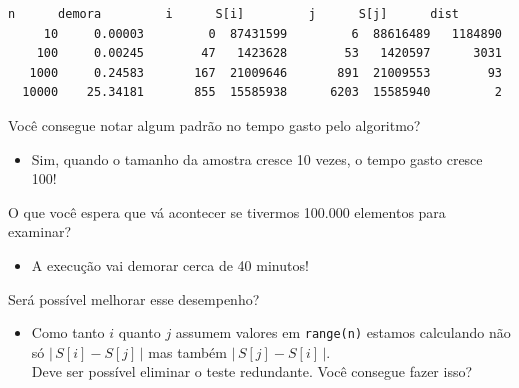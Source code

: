 \documentclass[11pt,a4paper]{article}
\providecommand{\tightlist}{%
      \setlength{\itemsep}{0pt}\setlength{\parskip}{0pt}}
\begin{document}
    \begin{Verbatim}[commandchars=\\\{\}]
      n      demora         i      S[i]         j      S[j]      dist
     10     0.00003         0  87431599         6  88616489   1184890
    100     0.00245        47   1423628        53   1420597      3031
   1000     0.24583       167  21009646       891  21009553        93
  10000    25.34181       855  15585938      6203  15585940         2

    \end{Verbatim}

    Você consegue notar algum padrão no tempo gasto pelo algoritmo?

    \begin{itemize}
\tightlist
\item
  Sim, quando o tamanho da amostra cresce 10 vezes, o tempo gasto cresce
  100!
\end{itemize}

    O que você espera que vá acontecer se tivermos 100.000 elementos para
examinar?

    \begin{itemize}
\tightlist
\item
  A execução vai demorar cerca de 40 minutos!
\end{itemize}

    Será possível melhorar esse desempenho?

\begin{itemize}
\tightlist
\item
  Como tanto \(i\) quanto \(j\) assumem valores em \texttt{range(n)}
  estamos calculando não só \(\lvert\, S[i] - S[j] \,\rvert\) mas também
  \(\lvert\, S[j] - S[i] \,\rvert\).\\
  Deve ser possível eliminar o teste redundante. Você consegue fazer
  isso?
\end{itemize}
\end{document}
